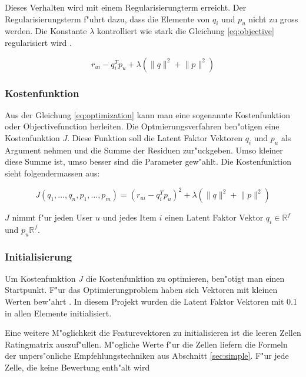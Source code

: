 \documentclass[a4paper, 12pt]{article}
\begin{document}
 Dieses Verhalten wird mit einem Regularisierungterm erreicht. Der Regularisierungsterm f"uhrt dazu, dass die Elemente von $q_i$ und $p_u$ nicht zu gross werden. Die Konstante $\lambda$ kontrolliert wie stark die Gleichung \ref{eq:objective} regularisiert wird \cite{koren2009}.

\begin{equation}
  \label{eq:optimization}
    r_{ui} - q_i^T p_u + \lambda (\lVert q \rVert^2 + \lVert p \lVert ^2)
\end{equation}

\subsubsection{Kostenfunktion}
\label{sec:opt}

Aus der Gleichung \ref{eq:optimization} kann man eine sogenannte Kostenfunktion oder Objectivefunction herleiten. Die Optmierungsverfahren ben"otigen eine Kostenfunktion $J$. Diese Funktion soll die Latent Faktor Vektoren $q_i$ und $p_u$ als Argument nehmen und die Summe der Residuen zur"uckgeben. Umso kleiner diese Summe ist, umso besser sind die Parameter gew"ahlt. Die Kostenfunktion sieht folgendermassen aus:

\begin{equation}
  \label{eq:costfunction}
  J(q_1, \dots , q_n, p_1, \dots, p_m) =  (r_{ui} - q_i^T p_u)^2 + \lambda (\lVert q \rVert^2 + \lVert p \lVert ^2)
\end{equation}

$J$ nimmt f"ur jeden User $u$ und jedes Item $i$ einen Latent Faktor Vektor $q_i \in \mathbb{R}^f$ und $p_u \mathbb{R}^f$.

\subsubsection{Initialisierung}
\label{sec:init}

Um Kostenfunktion $J$ die Kostenfunktion zu optimieren, ben"otigt man einen Startpunkt. F"ur das Optimierungproblem \label{eq:objective} haben sich Vektoren mit kleinen Werten bew"ahrt \cite{Takacs08}. In diesem Projekt wurden die Latent Faktor Vektoren mit 0.1 in allen Elemente initialisiert.

Eine weitere M"oglichkeit die Featurevektoren zu initialisieren ist die leeren Zellen Ratingmatrix auszuf"ullen. M"ogliche Werte f"ur die Zellen liefern die Formeln der unpers"onliche Empfehlungstechniken aus Abschnitt \ref{sec:simple}. F"ur jede Zelle, die keine Bewertung enth"alt wird
\end{document}
